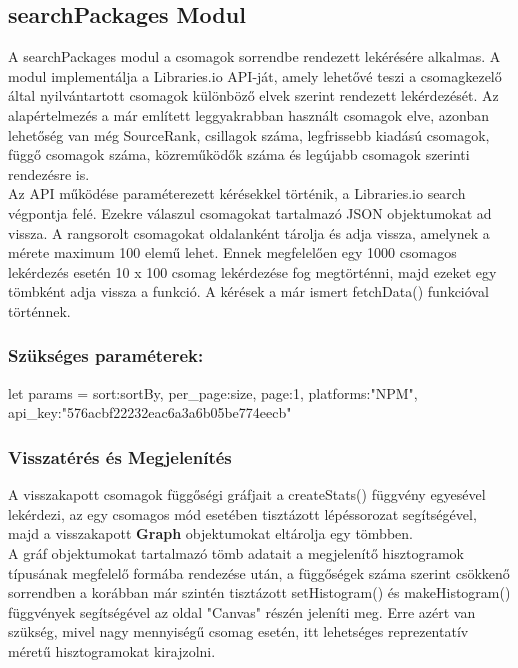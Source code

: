 \subsection{searchPackages Modul}

A searchPackages modul a csomagok sorrendbe rendezett lekérésére alkalmas. A modul implementálja a Libraries.io API-ját, amely lehetővé teszi a csomagkezelő által nyilvántartott csomagok különböző elvek szerint rendezett lekérdezését. Az alapértelmezés a már említett leggyakrabban használt csomagok elve, azonban lehetőség van még SourceRank, csillagok száma, legfrissebb kiadású csomagok, függő csomagok száma, közreműködők száma és legújabb csomagok szerinti rendezésre is.\\

Az API működése paraméterezett kérésekkel történik, a Libraries.io search végpontja felé. Ezekre válaszul csomagokat tartalmazó JSON objektumokat ad vissza. A rangsorolt csomagokat oldalanként tárolja és adja vissza, amelynek a mérete maximum 100 elemű lehet. Ennek megfelelően egy 1000 csomagos lekérdezés esetén 10 x 100 csomag lekérdezése fog megtörténni, majd ezeket egy tömbként adja vissza a funkció. A kérések a már ismert fetchData() funkcióval történnek.

\subsubsection{Szükséges paraméterek:}
\begin{js}
let params = {
	sort:sortBy, 
	per_page:size,
	page:1,
	platforms:"NPM",
	api_key:"576acbf22232eac6a3a6b05be774eecb"
}
\end{js}

\subsubsection{Visszatérés és Megjelenítés}

A visszakapott csomagok függőségi gráfjait a createStats() függvény egyesével lekérdezi, az egy csomagos mód esetében tisztázott lépéssorozat segítségével, majd a visszakapott \textbf{Graph} objektumokat eltárolja egy tömbben.\\

A gráf objektumokat tartalmazó tömb adatait a megjelenítő hisztogramok típusának megfelelő formába rendezése után, a függőségek száma szerint csökkenő sorrendben a korábban már szintén tisztázott setHistogram() és makeHistogram() függvények segítségével az oldal "Canvas" részén jeleníti meg. Erre azért van szükség, mivel nagy mennyiségű csomag esetén, itt lehetséges reprezentatív méretű hisztogramokat kirajzolni.

